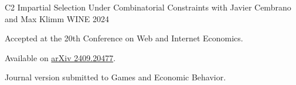 \vspace{2 mm}


\begin{cvpublications}
\cvpublication
{C2} %
{Impartial Selection Under Combinatorial Constraints} %
{with Javier Cembrano and Max Klimm} %
{WINE} %
{2024}
{
\begin{cvitems} %
  \item Accepted at the 20th Conference on Web and Internet Economics.
  \item[] Available on \href{https://arxiv.org/abs/2409.20477}{arXiv 2409.20477}.
  \item Journal version submitted to Games and Economic Behavior. 
\end{cvitems}
}


\vspace{5 mm}
\end{cvpublications}
